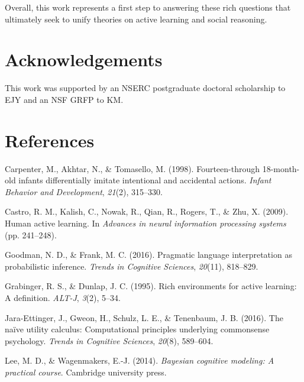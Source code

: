 \documentclass[10pt, letterpaper]{article}
\begin{document}
Overall, this work represents a first step to answering these rich
questions that ultimately seek to unify theories on active learning and
social reasoning.

\vspace{1em}
\vspace{1em} \noindent

\section{Acknowledgements}\label{acknowledgements}

This work was supported by an NSERC postgraduate doctoral scholarship to
EJY and an NSF GRFP to KM.

\section{References}\label{references}

\setlength{\parindent}{-0.1in} \setlength{\leftskip}{0.125in}

\noindent

\hypertarget{refs}{}
\hypertarget{ref-carpenter1998fourteen}{}
Carpenter, M., Akhtar, N., \& Tomasello, M. (1998). Fourteen-through
18-month-old infants differentially imitate intentional and accidental
actions. \emph{Infant Behavior and Development}, \emph{21}(2), 315--330.

\hypertarget{ref-castro2009human}{}
Castro, R. M., Kalish, C., Nowak, R., Qian, R., Rogers, T., \& Zhu, X.
(2009). Human active learning. In \emph{Advances in neural information
processing systems} (pp. 241--248).

\hypertarget{ref-goodman2016}{}
Goodman, N. D., \& Frank, M. C. (2016). Pragmatic language
interpretation as probabilistic inference. \emph{Trends in Cognitive
Sciences}, \emph{20}(11), 818--829.

\hypertarget{ref-grabinger1995rich}{}
Grabinger, R. S., \& Dunlap, J. C. (1995). Rich environments for active
learning: A definition. \emph{ALT-J}, \emph{3}(2), 5--34.

\hypertarget{ref-jara2016}{}
Jara-Ettinger, J., Gweon, H., Schulz, L. E., \& Tenenbaum, J. B. (2016).
The naïve utility calculus: Computational principles underlying
commonsense psychology. \emph{Trends in Cognitive Sciences},
\emph{20}(8), 589--604.

\hypertarget{ref-lee2014bayesian}{}
Lee, M. D., \& Wagenmakers, E.-J. (2014). \emph{Bayesian cognitive
modeling: A practical course}. Cambridge university press.
\end{document}
